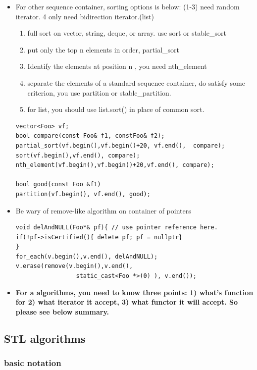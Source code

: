 \documentclass[a4paper,11pt,twoside]{book}
\begin{document}
\begin{itemize}
\item For other sequence container, sorting options is below: (1-3) need random iterator. 4 only need bidirection iterator.(list)
  \begin{enumerate}
  \item full sort on vector, string, deque, or array.  use sort or stable\_sort
  \item put only the top n elements in order, partial\_sort
  \item Identify the elements at position n , you need nth\_element
  \item separate the elements of a standard sequence container, do satisfy some criterion, you use partition or stable\_partition.
  \item for list, you should use list.sort() in place of common sort.
  \end{enumerate}
\begin{lstlisting}[numbers=none]
vector<Foo> vf;
bool compare(const Foo& f1, constFoo& f2);
partial_sort(vf.begin(),vf.begin()+20, vf.end(),  compare);
sort(vf.begin(),vf.end(), compare);
nth_element(vf.begin(),vf.begin()+20,vf.end(), compare);

bool good(const Foo &f1)
partition(vf.begin(), vf.end(), good);
\end{lstlisting}

\item Be wary of remove-like algorithm on container of pointers
\begin{lstlisting}[numbers=none]
void delAndNULL(Foo*& pf){ // use pointer reference here.
if(!pf->isCertified(){ delete pf; pf = nullptr}
}
for_each(v.begin(),v.end(), delAndNULL);
v.erase(remove(v.begin(),v.end(),
                 static_cast<Foo *>(0) ), v.end());
\end{lstlisting}


\item \textbf{For a algorithms, you need to know three points: 1) what's function  for 2) what iterator it accept, 3) what functor it will accept.  So please see below summary. }
\end{itemize}

\subsection{STL algorithms}
\subsubsection{basic notation}
\end{document}
